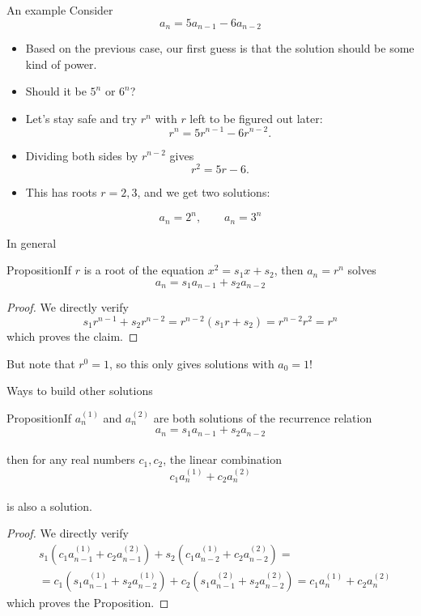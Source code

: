 \documentclass{beamer}
\def\bl[#1]#2{\begin{block}{#1}#2\end{block}}
\def\itemb{\begin{itemize}}
\def\iteme{\end{itemize}}
\begin{document}
\begin{frame}{An example}
Consider
\[
a_n=5a_{n-1}-6a_{n-2}
\]\vspace{-0.7cm}

\itemb
\item Based on the previous case, our first guess is that the solution should be some kind of power. 
\item Should it be $5^n$ or $6^n$?
\item Let's stay safe and try $r^n$ with $r$ left to be figured out later:
\[
r^n=5r^{n-1}-6r^{n-2}.
\]
\item Dividing both sides by $r^{n-2}$ gives
\[
r^2=5r-6.
\]
\item This has roots $r=2,3$, and we get two solutions:
\iteme
\bl[]{
\[
a_n=2^n,\qquad a_n=3^n
\]
}
\end{frame}

\begin{frame}{In general}
\bl[Proposition]{If $r$ is a root of the equation $x^2=s_1x+s_2$, then $a_n=r^n$ solves
\[
a_n=s_1a_{n-1}+s_2a_{n-2}
\]
}
\begin{proof}
We directly verify
\[
s_1r^{n-1}+s_2r^{n-2}=r^{n-2}(s_1r+s_2)=r^{n-2}r^2=r^n
\]
which proves the claim.
\end{proof}
\center But note that $r^0=1$, so this only gives solutions with $a_0=1$!

\end{frame}

\begin{frame}{Ways to build other solutions}
\bl[Proposition]{If $a^{(1)}_n$ and $a^{(2)}_n$ are both solutions of the recurrence relation\vspace{-0.3cm}
\[
a_n=s_1a_{n-1}+s_2a_{n-2}
\]\vspace{-0.8cm}\\
then for any real numbers $c_1, c_2$, the linear combination\vspace{-0.2cm}
\[
c_1a^{(1)}_n+c_2a^{(2)}_n
\]\vspace{-0.8cm}\\
is also a solution.}
\begin{proof}
We directly verify
\begin{align*}
&s_1(c_1a^{(1)}_{n-1}+c_2a^{(2)}_{n-1})+s_2(c_1a^{(1)}_{n-2}+c_2a^{(2)}_{n-2})=\\
&=c_1(s_1a^{(1)}_{n-1}+s_2a^{(1)}_{n-2})+c_2(s_1a^{(2)}_{n-1}+s_2a^{(2)}_{n-2})=c_1a^{(1)}_{n}+c_2a^{(2)}_n
\end{align*}
which proves the Proposition.
\end{proof}
\end{frame}
\end{document}
